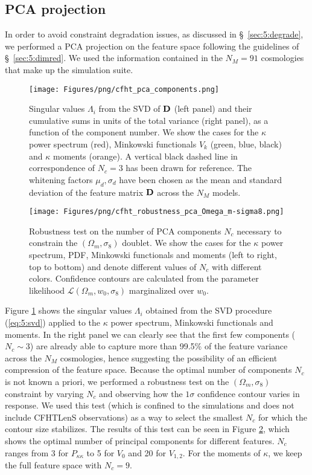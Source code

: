 \subsection{PCA projection}
In order to avoid constraint degradation issues, as discussed in \S~\ref{sec:5:degrade}, we performed a PCA projection on the feature space following the guidelines of \S~\ref{sec:5:dimred}. We used the information contained in the $N_M=91$ cosmologies that make up the  simulation suite. 
%
\begin{figure}
\begin{center}
\texttt{[image: Figures/png/cfht\_pca\_components.png]}
\end{center}
\caption{Singular values $\Lambda_i$ from the SVD of $\mathbf{D}$ (left panel) and their cumulative sums in units of the total variance (right panel), as a function of the component number. We show the cases for the $\kappa$ power spectrum (red), Minkowski functionals $V_k$ (green, blue, black) and $\kappa$ moments (orange). A vertical black dashed line in correspondence of $N_c=3$ has been drawn for reference. The whitening factors $\mu_d,\sigma_d$ have been chosen as the mean and standard deviation of the feature matrix $\mathbf{D}$ across the $N_M$ models.}
\label{fig:6:pcacomp}
\end{figure} 
%
\begin{figure}
\begin{center}
\texttt{[image: Figures/png/cfht\_robustness\_pca\_Omega\_m-sigma8.png]}
\end{center}
\caption{Robustness test on the number of PCA components $N_c$ necessary to constrain the $(\Omega_m,\sigma_8)$ doublet. We show the cases for the $\kappa$ power spectrum, PDF, Minkowski functionals and moments (left to right, top to bottom) and denote different values of $N_c$ with different colors. Confidence contours are calculated from the parameter likelihood $\mathcal{L}(\Omega_m,w_0,\sigma_8)$ marginalized over $w_0$.}
\label{fig:6:robustness}
\end{figure}
%
Figure \ref{fig:6:pcacomp} shows the singular values $\Lambda_i$ obtained from the SVD procedure (\ref{eq:5:svd}) applied to the $\kappa$ power spectrum, Minkowski functionals and moments. In the right panel we can clearly see that the first few components ($N_c\sim 3$) are already able to capture more than 99.5\% of the feature variance across the $N_M$ cosmologies, hence suggesting the possibility of an efficient compression of the feature space. Because the optimal number of components $N_c$ is not known a priori, we performed a robustness test on the $(\Omega_m,\sigma_8)$ constraint by varying $N_c$ and observing how the $1\sigma$ confidence contour varies in response. We used this test (which is confined to the simulations and does not include CFHTLenS observations) as a way to select the smallest $N_c$ for which the contour size stabilizes. The results of this test can be seen in Figure \ref{fig:6:robustness}, which shows the optimal number of principal components for different features. $N_c$ ranges from 3 for $P_{\kappa\kappa}$ to 5 for $V_0$ and 20 for $V_{1,2}$. For the moments of $\kappa$, we keep the full feature space with $N_c=9$. 

